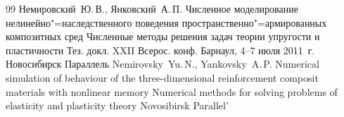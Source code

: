 \begin{thebibliography}{99}
\by Немировский~Ю.\,В., Янковский~А.\,П.
\paper Численное моделирование нелинейно"=наследственного поведения пространственно"=армированных композитных сред
\inbook Численные методы решения задач теории упругости и пластичности
\bookinfo Тез. докл. XXII Всерос. конф.
\procinfo Барнаул, 4--7 июля 2011~г.
\publaddr Новосибирск
\publ Параллель
\misctransl
\by Nemirovsky~Yu.\,N., Yankovsky~A.\,P.
\paper Numerical simulation of behaviour of the three-dimensional reinforcement composit materials with nonlinear memory
\inbook Numerical methods for solving problems of elasticity and plasticity theory 
\publaddr Novosibirsk
\publ Parallel'

\end{thebibliography}


\noindent
\hskip6.5cm \thedate \par\noindent
\hskip6.5cm\therevdate


\vspace{-6mm}
%

\makeengtitle

\newpage

%
%
